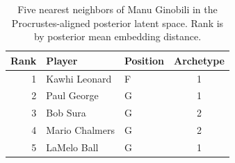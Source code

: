 \begin{table}[htbp]
  \centering\small
  \begin{tabular}{rllc}
    \toprule
    Rank & Player & Position & Archetype \\
    \midrule
    1 & Kawhi Leonard & F & 1 \\
    2 & Paul George & G & 1 \\
    3 & Bob Sura & G & 2 \\
    4 & Mario Chalmers & G & 2 \\
    5 & LaMelo Ball & G & 1 \\
    \bottomrule
  \end{tabular}
  \caption{Five nearest neighbors of Manu Ginobili in the Procrustes-aligned posterior latent space. Rank is by posterior mean embedding distance.}
  \label{tab:Manu_Ginobili_neighbors}
\end{table}

